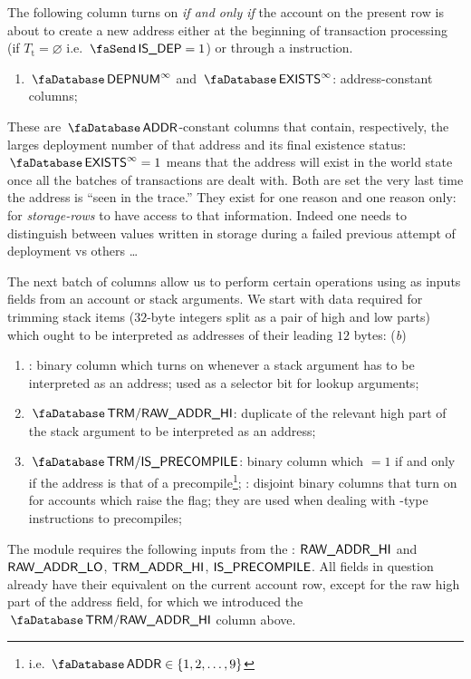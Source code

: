 The following column turns on \emph{if and only if} the account on the present row is about to create a new address either at the beginning of transaction processing (if $T_\text{t} = \varnothing$ i.e. $\txIsDeployment = 1$) or through a  instruction. 
\begin{enumerate}[resume]
	\item {}$\accDepNumber^\infty$ and $\accExists^\infty$:
		address-constant columns;
\end{enumerate}
These are $\accAddress$-constant columns that contain, respectively, the larges deployment number of that address and its final existence status: $\accExists^\infty = 1$ means that the address will exist in the world state once all the batches of transactions are dealt with. Both are set the very last time the address is ``seen in the trace.'' They exist for one reason and one reason only: for \emph{storage-rows} to have access to that information. Indeed one needs to distinguish between values written in storage during a failed previous attempt of deployment vs others \dots{}  

The next batch of columns allow us to perform certain operations using as inputs fields from an account or stack arguments. We start with data required for trimming stack items ($32$-byte integers split as a pair of high and low parts) which ought to be interpreted as addresses of their leading $12$ bytes:
(\emph{b})
\begin{enumerate}[resume]
	\item \accTrmFlag: binary column which turns on whenever a stack argument has to be interpreted as an address; used as a selector bit for lookup arguments;
	\item $\accTrmRawAddrHi$: duplicate of the relevant high part of the stack argument to be interpreted as an address;
	\item $\accTrmIsPrecompile$:
		binary column which $=1$ if and only if the address is that of a precompile\footnote{i.e. $\accAddress \in \{1, 2, \dots, 9 \}$};
		: disjoint binary columns that turn on for accounts which raise the \accTrmIsPrecompile{} flag; they are used when dealing with -type instructions to precompiles;
\end{enumerate}
\saNote{} The \trmMod{} module requires the following inputs from the \hubMod{}:
$\textsf{RAW\_ADDR\_HI}$ and $\textsf{RAW\_ADDR\_LO}$,
$\textsf{TRM}\textsf{\_}\textsf{ADDR}\textsf{\_HI}$,
$\textsf{IS\_PRECOMPILE}$.
All fields in question already have their equivalent on the current account row, except for the raw high part of the address field, for which we introduced the $\accTrmRawAddrHi$ column above.


